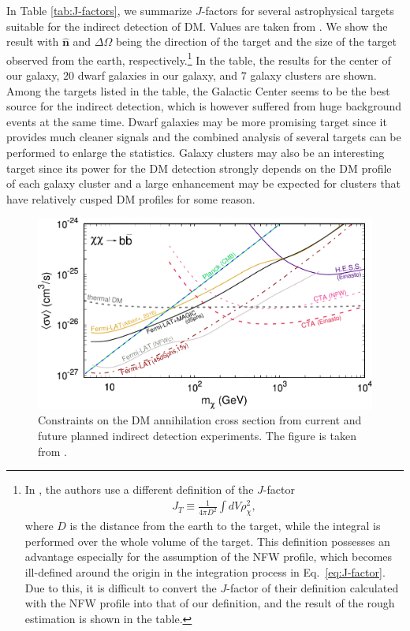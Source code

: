 \documentclass[12pt,twoside,book]{article}
\begin{document}
In Table \ref{tab:J-factors}, we summarize $J$-factors for several astrophysical targets suitable for the indirect detection of DM.
Values are taken from \cite{Fornasa:2013iaa, Geringer-Sameth:2014yza, S_nchez_Conde_2011}.
We show the result with $\hat{\bm{n}}$ and $\Delta\Omega$ being the direction of the target and the size of the target observed from the earth, respectively.\footnote{
  In \cite{S_nchez_Conde_2011}, the authors use a different definition of the $J$-factor
  \begin{align}
    J_T \equiv \frac{1}{4\pi D^2} \int dV \rho_\chi^2,
  \end{align}
  where $D$ is the distance from the earth to the target, while the integral is performed over the whole volume of the target.
  This definition possesses an advantage especially for the assumption of the NFW profile, which becomes ill-defined around the origin in the integration process in Eq.~\eqref{eq:J-factor}.
  Due to this, it is difficult to convert the $J$-factor of their definition calculated with the NFW profile into that of our definition, and the result of the rough estimation is shown in the table.
}
In the table, the results for the center of our galaxy, $20$ dwarf galaxies in our galaxy, and $7$ galaxy clusters are shown.
Among the targets listed in the table, the Galactic Center seems to be the best source for the indirect detection, which is however suffered from huge background events at the same time.
Dwarf galaxies may be more promising target since it provides much cleaner signals and the combined analysis of several targets can be performed to enlarge the statistics.
Galaxy clusters may also be an interesting target since its power for the DM detection strongly depends on the DM profile of each galaxy cluster and a large enhancement may be expected for clusters that have relatively cusped DM profiles for some reason.

\begin{figure}[t]
  \centering
  \includegraphics[width=0.7\hsize]{IDplot.pdf}
  \caption{
    Constraints on the DM annihilation cross section from current and future planned indirect detection experiments.
    The figure is taken from \cite{Roszkowski:2017nbc}.
  }
  \label{fig:indirect_detection}
\end{figure}
\end{document}
